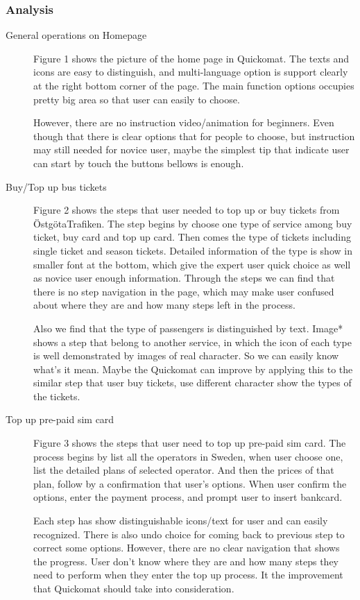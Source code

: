 \documentclass[twocolumn]{article}
\begin{document}
\subsubsection{Analysis}
\begin{description}
  \item[General operations on Homepage]

    Figure 1 shows the picture of the home page in Quickomat. The texts and icons are easy to distinguish, and multi-language option is support clearly at the right bottom corner of the page. The main function options occupies pretty big area so that user can easily to choose.

    However, there are no instruction video/animation for beginners. Even though that there is clear options that for people to choose, but instruction may still needed for novice user, maybe the simplest tip that indicate user can start by touch the buttons bellows is enough.

  \item[Buy/Top up bus tickets]
    Figure 2 shows the steps that user needed to top up or buy tickets from ÖstgötaTrafiken. The step begins by choose one type of service among buy ticket, buy card and top up card. Then comes the type of tickets including single ticket and season tickets. Detailed information of the type is show in smaller font at the bottom, which give the expert user quick choice as well as novice user enough information. Through the steps we can find that there is no step navigation in the page, which may make user confused about where they are and how many steps left in the process.

    Also we find that the type of passengers is distinguished by text. Image* shows a step that belong to another service, in which the icon of each type is well demonstrated by images of real character. So we can easily know what’s it mean. Maybe the Quickomat can improve by applying this to the similar step that user buy tickets, use different character show the types of the tickets.

  \item[Top up pre-paid sim card]
    Figure 3 shows the steps that user need to top up pre-paid sim card. The process begins by list all the operators in Sweden, when user choose one, list the detailed plans of selected operator. And then the prices of that plan, follow by a confirmation that user’s options. When user confirm the options, enter the payment process, and prompt user to insert bankcard.

    Each step has show distinguishable icons/text for user and can easily recognized. There is also undo choice for coming back to previous step to correct some options. However, there are no clear navigation that shows the progress. User don’t know where they are and how many steps they need to perform when they enter the top up process. It the improvement that Quickomat should take into consideration.
\end{description}
\end{document}

